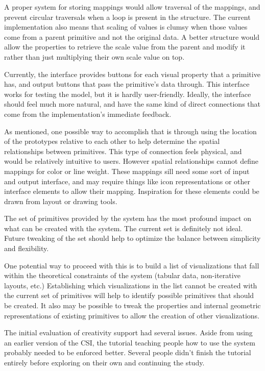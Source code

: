 A proper system for storing mappings would allow traversal of the mappings, and prevent circular traversals when a loop is present in the structure.
The current implementation also means that scaling of values is clumsy when those values come from a parent primitive and not the original data.
A better structure would allow the properties to retrieve the scale value from the parent and modify it rather than just multiplying their own scale value on top.

\label{primConnectionsFW}
Currently, the interface provides buttons for each visual property that a primitive has, and output buttons that pass the primitive's data through.
This interface works for testing the model, but it is hardly user-friendly.
Ideally, the interface should feel much more natural, and have the same kind of direct connections that come from the implementation's immediate feedback.

As mentioned, one possible way to accomplish that is through using the location of the prototypes relative to each other to help determine the spatial relationships between primitives.
This type of connection feels physical, and would be relatively intuitive to users.
However spatial relationships cannot define mappings for color or line weight.
These mappings sill need some sort of input and output interface, and may require things like icon representations or other interface elements to allow their mapping.
Inspiration for these elements could be drawn from layout or drawing tools.

\label{setPrimitivesFW}
The set of primitives provided by the system has the most profound impact on what can be created with the system.
The current set is definitely not ideal.
Future tweaking of the set should help to optimize the balance between simplicity and flexibility.

One potential way to proceed with this is to build a list of visualizations that fall within the theoretical constraints of the system (tabular data, non-iterative layouts, etc.)
Establishing which visualizations in the list cannot be created with the current set of primitives will help to identify possible primitives that should be created.
It also may be possible to tweak the properties and internal geometric representations of existing primitives to allow the creation of other visualizations.

\label{creativitySupportFW}
The initial evaluation of creativity support had several issues.
Aside from using an earlier version of the CSI, the tutorial teaching people how to use the system probably needed to be enforced better.
Several people didn't finish the tutorial entirely before exploring on their own and continuing the study.

